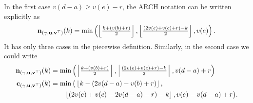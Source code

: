 \begin{remark}
  In the first case $v(d-a) \ge v(e) - r$,
  the ARCH notation can be written explicitly as
  \[ \mathbf n_{(\gamma, \mathbf u, \mathbf v^\top)}(k) = \min\left( \left\lfloor \tfrac{k + (v(b)+r)}{2} \right\rfloor,
    \left\lfloor \tfrac{(2v(e)+v(c)+r)-k}{2} \right\rfloor, v(e) \right). \]
  It has only three cases in the piecewise definition.
  Similarly, in the second case we could write
  \begin{align*}
    \mathbf n_{(\gamma, \mathbf u, \mathbf v^\top)}(k) &= \min\left( \left\lfloor \tfrac{k + (v(b)+r)}{2} \right\rfloor,
      \left\lfloor \tfrac{(2v(e)+v(c)+r)-k}{2} \right\rfloor, v(d-a)+r \right) \\
    \mathbf c_{(\gamma, \mathbf u, \mathbf v^\top)}(k) &= \min\big( \left\lfloor k - (2v(d-a)-v(b)+r) \right\rfloor, \\
      &\qquad \left\lfloor(2v(e)+v(c)-2v(d-a)-r)-k \right\rfloor, v(e)-v(d-a)+r \big).
  \end{align*}
\end{remark}

